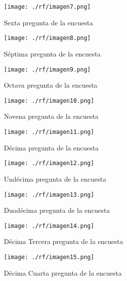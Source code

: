 \begin{figure}[H]
    \centering %
          \texttt{[image: ./rf/imagen7.png]} 
    \caption{Sexta pregunta de la encuesta \cite{GOOGLE-FORMS}}
   \label{figure:Resultado 8} %
\end{figure}
\begin{figure}[H]
    \centering %
         \texttt{[image: ./rf/imagen8.png]} 
    \caption{Séptima pregunta de la encuesta \cite{GOOGLE-FORMS}}
   \label{figure:Resultado 9} %
\end{figure}
\begin{figure}[H]
    \centering %
         \texttt{[image: ./rf/imagen9.png]} 
    \caption{Octava pregunta de la encuesta \cite{GOOGLE-FORMS}}
   \label{figure:Resultado 10} %
\end{figure}
\begin{figure}[H]
    \centering %
         \texttt{[image: ./rf/imagen10.png]} 
    \caption{Novena pregunta de la encuesta \cite{GOOGLE-FORMS}}
   \label{figure:Resultado 11} %
\end{figure}
\begin{figure}[H]
    \centering %
         \texttt{[image: ./rf/imagen11.png]} 
    \caption{Décima pregunta de la encuesta \cite{GOOGLE-FORMS}}
   \label{figure:Resultado 12} %
\end{figure}
\begin{figure}[H]
    \centering %
         \texttt{[image: ./rf/imagen12.png]} 
    \caption{Undécima pregunta de la encuesta \cite{GOOGLE-FORMS}}
   \label{figure:Resultado 13} %
\end{figure}
\begin{figure}[H]
    \centering %
         \texttt{[image: ./rf/imagen13.png]} 
    \caption{Duodécima pregunta de la encuesta \cite{GOOGLE-FORMS}}
   \label{figure:Resultado 14} %
\end{figure}
\begin{figure}[H]
    \centering %
         \texttt{[image: ./rf/imagen14.png]} 
    \caption{Décima Tercera pregunta de la encuesta \cite{GOOGLE-FORMS}}
   \label{figure:Resultado 15} %
\end{figure}
\begin{figure}[H]
    \centering %
         \texttt{[image: ./rf/imagen15.png]} 
    \caption{Décima Cuarta pregunta de la encuesta \cite{GOOGLE-FORMS}}
   \label{figure:Resultado 16} %
\end{figure}

